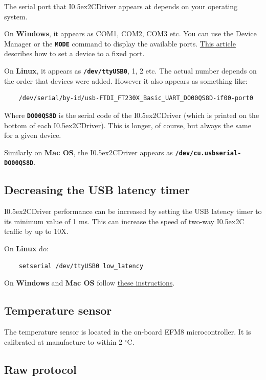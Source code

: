 \documentclass{article}
\newcommand{\two}{\raise0.5ex\hbox{\footnotesize{2}}}
\newcommand{\iic}{I\two{}C}
\newcommand{\iicdriver}{I\two{}CDriver}
\newcommand{\degc}{$^{\circ}$C}
\newcommand{\mach}[1]{\texttt{\textbf{#1}}}
\begin{document}
The serial port that \iicdriver{} appears at depends on your operating system.

On \textbf{Windows}, it appears as COM1, COM2, COM3 etc.
You can use the Device Manager or the \mach{MODE} command to display the available ports.
\href{https://plugable.com/2011/07/04/how-to-change-the-com-port-for-a-usb-serial-adapter-on-windows-7/}{This article}
describes how to set a device to a fixed port.

On \textbf{Linux}, it appears as \mach{/dev/ttyUSB0}, 1, 2 etc.
The actual number depends on the order that devices were added.
However it also appears as something like:
\begin{lstlisting}
    /dev/serial/by-id/usb-FTDI_FT230X_Basic_UART_DO00QS8D-if00-port0
\end{lstlisting}
Where \mach{DO00QS8D} is the serial code of the \iicdriver{} (which is printed on the bottom of each \iicdriver{}).
This is longer, of course, but always the same for a given device.

Similarly on \textbf{Mac OS}, the \iicdriver{} appears as \mach{/dev/cu.usbserial-DO00QS8D}.

\subsection{Decreasing the USB latency timer}

\iicdriver{} performance can be increased by setting the USB latency timer to its minimum value of 1 ms.
This can increase the speed of two-way \iic{} traffic by up to 10X.

On \textbf{Linux} do:

\begin{lstlisting}
    setserial /dev/ttyUSB0 low_latency
\end{lstlisting}

On \textbf{Windows} and \textbf{Mac OS} follow
\href{https://projectgus.com/2011/10/notes-on-ftdi-latency-with-arduino/}{these instructions}.

\subsection{Temperature sensor}

The temperature sensor is located in the on-board EFM8 microcontroller.
It is calibrated at manufacture to within 2 \degc.

\newpage
\subsection{Raw protocol}
\end{document}
